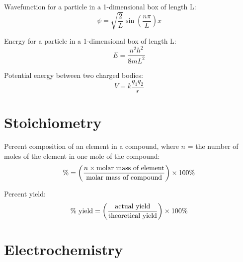 \documentclass[10pt]{article}
\begin{document}
Wavefunction for a particle in a 1-dimensional box of length L:
\begin{equation*}
\psi=\sqrt{\frac{2}{L}}\sin\left(\frac{n\pi}{L}\right)x
\end{equation*}

Energy for a particle in a 1-dimensional box of length L:
\begin{equation*}
E = \frac{n^2h^2}{8mL^2}
\end{equation*}

Potential energy between two charged bodies:
\begin{equation*}
V=k\frac{q_1q_2}{r}
\end{equation*}



\section{Stoichiometry}

Percent composition of an element in a compound, where $n$ = the number of moles of the element in one mole of the compound:
\begin{equation*}
\% = \left(\frac{n\times \textnormal{molar mass of element}}{\textnormal{molar mass of compound}}\right)\times 100\%
\end{equation*}

Percent yield:
\begin{equation*}
\textnormal{\% yield} = \left(\frac{\textnormal{actual yield}}{\textnormal{theoretical yield}}\right)\times 100\%
\end{equation*}


\newpage
\section{Electrochemistry}

\end{document}
